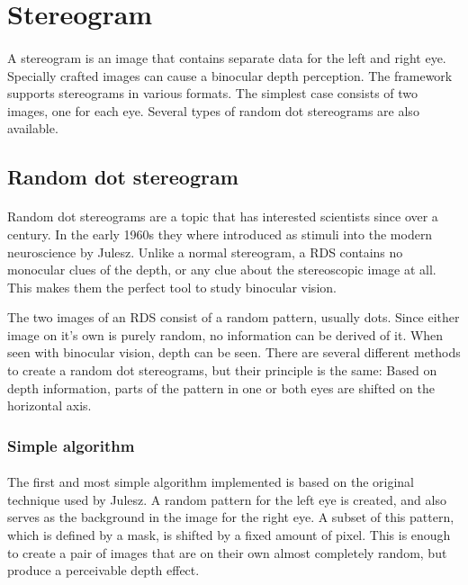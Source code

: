 \section{Stereogram\label{Stereogram}}
\paragraph{}
A stereogram is an image that contains separate data for the left and right eye. Specially crafted images can cause a binocular depth perception. The framework supports stereograms in various formats. The simplest case consists of two images, one for each eye. Several types of random dot stereograms are also available.

\subsection{Random dot stereogram\label{RDS}}
\paragraph{}
Random dot stereograms are a topic that has interested scientists since over a century\cite{AntRDS}. In the early 1960s they where introduced as stimuli into the modern neuroscience by Julesz\cite{BellRDS}. Unlike a normal stereogram, a RDS contains no monocular clues of the depth, or any clue about the stereoscopic image at all. This makes them the perfect tool to study binocular vision.

The two images of an RDS consist of a random pattern, usually dots. Since either image on it's own is purely random, no information can be derived of it. When seen with binocular vision, depth can be seen. There are several different methods to create a random dot stereograms, but their principle is the same:
Based on depth information, parts of the pattern in one or both eyes are shifted on the horizontal axis.

\subsubsection{Simple algorithm}
\paragraph{}
The first and most simple algorithm implemented is based on the original technique used by Julesz\cite{BellRDS}. A random pattern for the left eye is created, and also serves as the background in the image for the right eye. A subset of this pattern, which is defined by a mask, is shifted by a fixed amount of pixel. This is enough to create a pair of images that are on their own almost completely random, but produce a perceivable depth effect.


